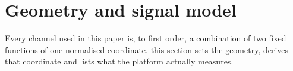 \section{Geometry and signal model} \label{sec:setup}

Every channel used in this paper is, to first order, a combination of two fixed functions of one normalised coordinate. this section sets the geometry, derives that coordinate and lists what the platform actually measures.






